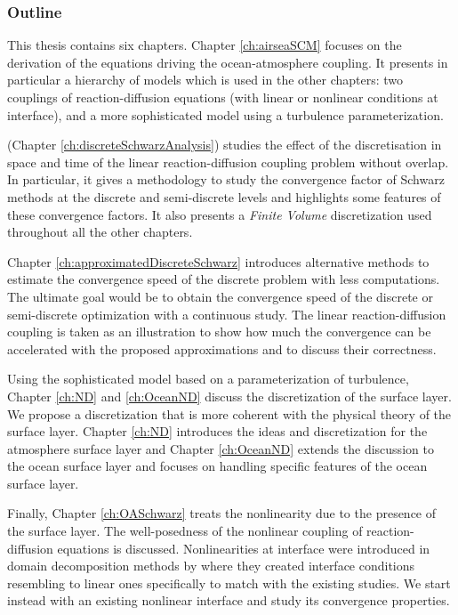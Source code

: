 \subsubsection*{Outline}
This thesis contains six chapters.
Chapter \ref{ch:airseaSCM} focuses on the derivation of the equations
driving the ocean-atmosphere coupling. It presents in particular
a hierarchy of models which is used in the other chapters:
two couplings of reaction-diffusion equations (with linear
or nonlinear conditions at interface), and a more sophisticated
model using a turbulence parameterization.
\par
%
\citep{clement_discrete_2022-1} (Chapter
\ref{ch:discreteSchwarzAnalysis}) studies the effect
of the discretisation in space and time of the linear
reaction-diffusion coupling problem without overlap.
In particular, it gives a methodology to study the convergence factor
of Schwarz methods at the discrete and semi-discrete levels
and highlights some features of these convergence factors.
It also presents a \textit{Finite Volume} discretization
used throughout all the other chapters.
\par
%
Chapter \ref{ch:approximatedDiscreteSchwarz}
introduces alternative methods to estimate the convergence
speed of the discrete problem with less computations.
The ultimate goal would be to obtain the convergence speed of
the discrete or semi-discrete optimization with a continuous study.
The linear reaction-diffusion coupling is taken as an illustration
to show how much the convergence can be accelerated with the
proposed approximations and to discuss their correctness.
\par
%
Using the sophisticated model based on a parameterization of turbulence,
Chapter \ref{ch:ND} and \ref{ch:OceanND} discuss the discretization of
the surface layer. We propose a discretization that is more coherent
with the physical theory of the surface layer.
Chapter \ref{ch:ND} introduces the ideas
and discretization for the atmosphere surface layer and
Chapter \ref{ch:OceanND} extends the
discussion to the ocean surface layer and focuses on handling
specific features of the ocean surface layer.
%
\par
Finally, Chapter \ref{ch:OASchwarz} treats the nonlinearity due
to the presence of the surface layer.
The well-posedness of the nonlinear coupling of
reaction-diffusion equations is discussed.
Nonlinearities
at interface were introduced in domain decomposition methods by
\citep{caetano_schwarz_2011} where they created interface
conditions resembling to linear ones specifically to match
with the existing studies.
We start instead with an existing nonlinear interface
and study its convergence properties.
